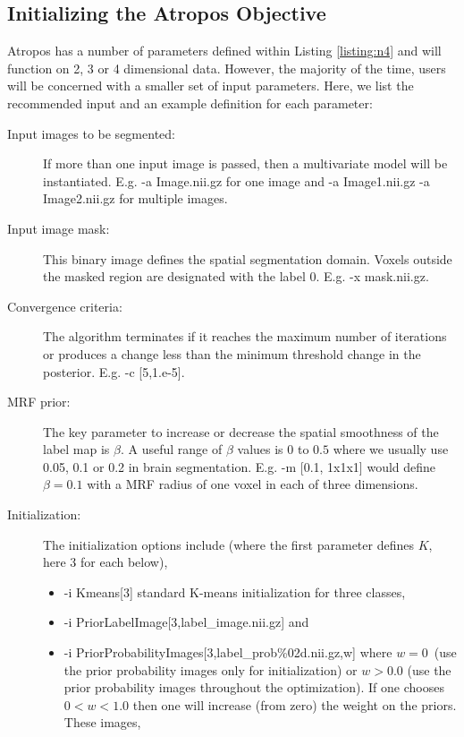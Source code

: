 \documentclass[11pt,english]{article}
\begin{document}
\doublespacing
\subsection{Initializing the Atropos Objective}
Atropos has a number of parameters defined within
Listing \ref{listing:n4} and will function on 2, 3 or 4 dimensional
data.  However, the majority of the time, users will be concerned with
a smaller set of input parameters.  Here, we list the recommended input and
an example definition for each parameter:
\begin{description}
\item[Input images to be segmented:] If more than
  one input image is passed, then a multivariate model will be
  instantiated.  E.g.  {\ttfamily -a Image.nii.gz} for one image and
  {\ttfamily -a Image1.nii.gz -a Image2.nii.gz} for multiple images.
\item[Input image mask:] This binary image
  defines the spatial segmentation domain.  Voxels outside the
  masked region are designated with the label $0$.  E.g.  {\ttfamily -x mask.nii.gz}. 
\item[Convergence criteria:] The algorithm terminates if it reaches  the maximum number of iterations or
  produces a change less than the minimum threshold change in the posterior.
  E.g. {\ttfamily -c [5,1.e-5]}. 
\item[MRF prior:] The key parameter to increase or decrease the
  spatial smoothness of the label map is $\beta$.  A useful range of
  $\beta$ values is $0$ to $0.5$ where we usually use 0.05, 0.1 or 0.2
  in brain segmentation.  E.g.  {\ttfamily -m [0.1, 1x1x1]} would
  define $\beta=0.1$ with a MRF radius of one voxel in each of three dimensions.
\item[Initialization:] The initialization options include (where the
  first parameter defines $K$, here 3 for each below),
\begin{itemize}
\item  {\ttfamily -i  Kmeans[3]} standard K-means initialization for
  three classes,
\item  {\ttfamily -i  PriorLabelImage[3,label\_image.nii.gz]} and
\item  {\ttfamily -i  PriorProbabilityImages[3,label\_prob\%02d.nii.gz,w]} 
where $w=0$~(use the prior probability images only for
  initialization) or $w>0.0$ (use the prior probability images
  throughout the optimization).  If one chooses $0 < w < 1.0$ then one
  will increase (from zero) the weight on the priors.  These images,

\end{itemize}
\end{description}
\end{document}
